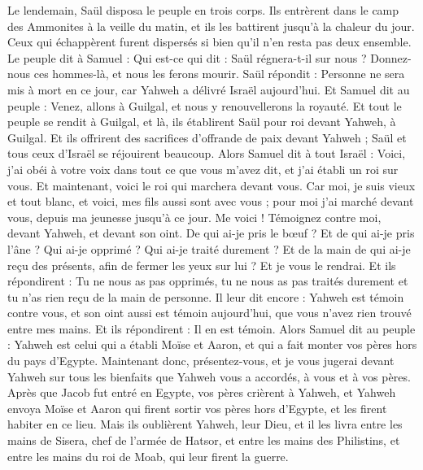 \begin{multicols}{2}
Le lendemain, Saül disposa le peuple en trois corps. Ils entrèrent dans le camp des Ammonites à la veille du matin, et ils les battirent jusqu'à la chaleur du jour. Ceux qui échappèrent furent dispersés si bien qu'il n'en resta pas deux ensemble.
Le peuple dit à Samuel : Qui est-ce qui dit : Saül régnera-t-il sur nous ? Donnez-nous ces hommes-là, et nous les ferons mourir.
Saül répondit : Personne ne sera mis à mort en ce jour, car Yahweh a délivré Israël aujourd'hui.
Et Samuel dit au peuple : Venez, allons à Guilgal, et nous y renouvellerons la royauté.
Et tout le peuple se rendit à Guilgal, et là, ils établirent Saül pour roi devant Yahweh, à Guilgal. Et ils offrirent des sacrifices d'offrande de paix devant Yahweh ; Saül et tous ceux d'Israël se réjouirent beaucoup.
\VerseOne{}Alors Samuel dit à tout Israël : Voici, j'ai obéi à votre voix dans tout ce que vous m'avez dit, et j'ai établi un roi sur vous.
Et maintenant, voici le roi qui marchera devant vous. Car moi, je suis vieux et tout blanc, et voici, mes fils aussi sont avec vous ; pour moi j'ai marché devant vous, depuis ma jeunesse jusqu'à ce jour.
Me voici ! Témoignez contre moi, devant Yahweh, et devant son oint. De qui ai-je pris le bœuf ? Et de qui ai-je pris l'âne ? Qui ai-je opprimé ? Qui ai-je traité durement ? Et de la main de qui ai-je reçu des présents, afin de fermer les yeux sur lui ? Et je vous le rendrai.
Et ils répondirent : Tu ne nous as pas opprimés, tu ne nous as pas traités durement et tu n'as rien reçu de la main de personne.
Il leur dit encore : Yahweh est témoin contre vous, et son oint aussi est témoin aujourd'hui, que vous n'avez rien trouvé entre mes mains. Et ils répondirent : Il en est témoin.
Alors Samuel dit au peuple : Yahweh est celui qui a établi Moïse et Aaron, et qui a fait monter vos pères hors du pays d'Egypte.
Maintenant donc, présentez-vous, et je vous jugerai devant Yahweh sur tous les bienfaits que Yahweh vous a accordés, à vous et à vos pères.
Après que Jacob fut entré en Egypte, vos pères crièrent à Yahweh, et Yahweh envoya Moïse et Aaron qui firent sortir vos pères hors d'Egypte, et les firent habiter en ce lieu.
Mais ils oublièrent Yahweh, leur Dieu, et il les livra entre les mains de Sisera, chef de l'armée de Hatsor, et entre les mains des Philistins, et entre les mains du roi de Moab, qui leur firent la guerre.

\end{multicols}
